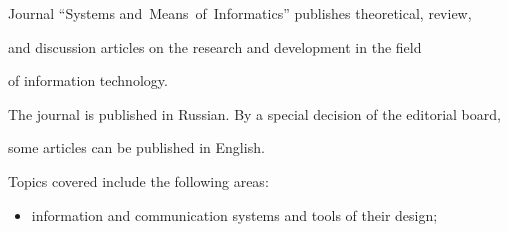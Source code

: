 {\small


{ %

















\noindent


Journal ``Systems and~Means~of~Informatics'' publishes theoretical, review,


and discussion articles on the research and development in the field


of information technology.





The journal is published in Russian. By a special decision of the editorial board,


some articles can be published in English.





\def\leftfootline{\small{\textbf{\thepage}


\hfill Sistemy i Sredstva Informatiki~---


Systems and Means of Informatics 2024 vol~34 no\,2}


}%


 \def\rightfootline{\small{Sistemy i Sredstva Informatiki~---


 Systems and Means of Informatics   2024   vol~34   no\,2


\hfill \textbf{\thepage}}}





Topics covered include the following areas:\\[-18pt]








\begin{itemize}


\item   information and communication systems and tools of their design;\\[-15pt]



\end{itemize}}}

